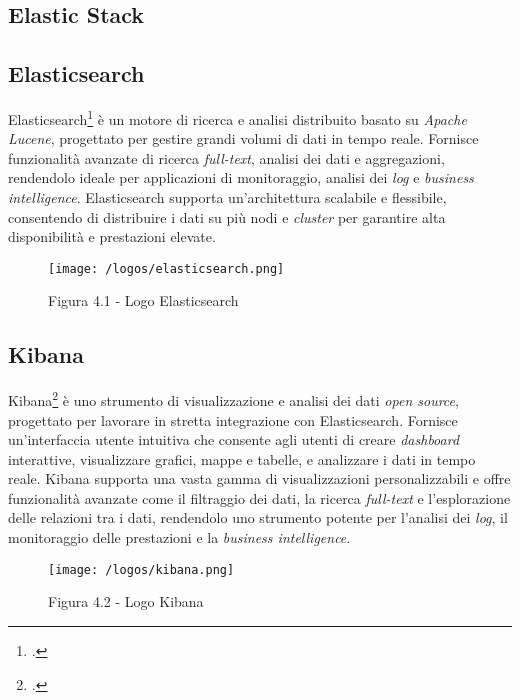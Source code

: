 \subsection{Elastic Stack}

\subsection*{Elasticsearch}
Elasticsearch\footcite{site:elasticsearch} è un motore di ricerca e analisi distribuito basato su \emph{Apache Lucene}, progettato per gestire grandi volumi di dati in tempo reale. Fornisce funzionalità avanzate di ricerca \emph{full-text}, analisi dei dati e aggregazioni, rendendolo ideale per applicazioni di monitoraggio, analisi dei \emph{log} e \emph{business intelligence}. Elasticsearch supporta un'architettura scalabile e flessibile, consentendo di distribuire i dati su più nodi e \emph{cluster} per garantire alta disponibilità e prestazioni elevate.
\begin{figure}[H] 
    \centering 
    \texttt{[image: /logos/elasticsearch.png]} 
    \caption{Figura 4.1 - Logo Elasticsearch}
\end{figure}

\vspace{1em}

\subsection*{Kibana}
Kibana\footcite{site:kibana} è uno strumento di visualizzazione e analisi dei dati \emph{open source}, progettato per lavorare in stretta integrazione con Elasticsearch. Fornisce un'interfaccia utente intuitiva che consente agli utenti di creare \emph{dashboard} interattive, visualizzare grafici, mappe e tabelle, e analizzare i dati in tempo reale. Kibana supporta una vasta gamma di visualizzazioni personalizzabili e offre funzionalità avanzate come il filtraggio dei dati, la ricerca \emph{full-text} e l'esplorazione delle relazioni tra i dati, rendendolo uno strumento potente per l'analisi dei \emph{log}, il monitoraggio delle prestazioni e la \emph{business intelligence}.
\begin{figure}[H] 
    \centering 
    \texttt{[image: /logos/kibana.png]} 
    \caption{Figura 4.2 - Logo Kibana}
\end{figure}

\vspace{1em}

